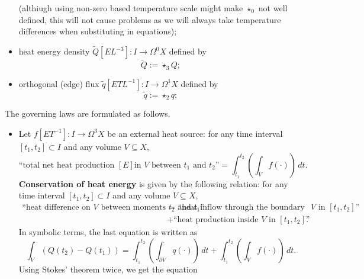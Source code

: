\begin{discussion}
\begin{itemize}
\begin{equation}
      \end{equation}
      (althiugh using non-zero based temperature scale might make $\star_0$ not
      well defined, this will not cause problems as we will always take
      temperature differences when substituting in equations);
    \item
      heat energy density $\tilde{Q} [E L^{-3}] \colon I \to \Omega^0 X$
      defined by
      \begin{equation}
        \tilde{Q} := \star_3 Q;
      \end{equation}
    \item
      orthogonal (edge) flux $\tilde{q} [E T L^{-1}] \colon I \to \Omega^1 X$
      defined by
      \begin{equation}
        \tilde{q} := \star_2 q;
      \end{equation}
  \end{itemize}
  The governing laws are formulated as follows.
  \begin{itemize}
    \item
      Let $f [E T^{-1}] \colon I \to \Omega^3 X$ be an external heat source:
      for any time interval $[t_1, t_2] \subset I$
      and any volume $V \subseteq X$,
      \begin{equation}
        \text{``total net heat production $[E]$
          in $V$ between $t_1$ and $t_2$''}
        = \int_{t_1}^{t_2} \left(\int_V f(\cdot) \right)\, d t.
      \end{equation}
      \textbf{Conservation of heat energy} is given by the following relation:
      for any time interval $[t_1, t_2] \subset I$
      and any volume $V \subseteq X$,
      \begin{equation}
        \begin{split}
        \text{``heat difference on $V$ between moments $t_2$ and $t_1$''}
        & =
          \text{``heat inflow through the boundary of $V$ in $[t_1, t_2]$''} \\
        & +
          \text{``heat production inside $V$ in $[t_1, t_2]$''}.
        \end{split}
      \end{equation}
      In symbolic terms, the last equation is written as
      \begin{equation}
        \int_V (Q(t_2) - Q(t_1)) =
          \int_{t_1}^{t_2} \left(\int_{\partial V} q(\cdot) \right)\, d t
        + \int_{t_1}^{t_2} \left(\int_V f(\cdot) \right)\, d t.
      \end{equation}
      Using Stokes' theorem twice, we get the equation

\end{itemize}
\end{discussion}
